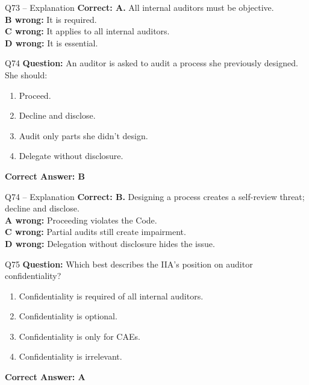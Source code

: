 \documentclass[aspectratio=169,10pt]{beamer}
\begin{document}
	\begin{frame}[t]{Q73 -- Explanation}
		\small
		\textbf{Correct: A.} All internal auditors must be objective. \\[4pt]
		\textbf{B wrong:} It is required. \\[2pt]
		\textbf{C wrong:} It applies to all internal auditors. \\[2pt]
		\textbf{D wrong:} It is essential.
	\end{frame}
	
	\begin{frame}[t]{Q74}
		\small
		\textbf{Question:} An auditor is asked to audit a process she previously designed. She should:
		\begin{enumerate}[label=\Alph*.,itemsep=1pt,topsep=2pt]
			\item Proceed.
			\item Decline and disclose.
			\item Audit only parts she didn't design.
			\item Delegate without disclosure.
		\end{enumerate}
		\vspace{4pt}
		\textbf{Correct Answer: B}
	\end{frame}
	
	\begin{frame}[t]{Q74 -- Explanation}
		\small
		\textbf{Correct: B.} Designing a process creates a self-review threat; decline and disclose. \\[4pt]
		\textbf{A wrong:} Proceeding violates the Code. \\[2pt]
		\textbf{C wrong:} Partial audits still create impairment. \\[2pt]
		\textbf{D wrong:} Delegation without disclosure hides the issue.
	\end{frame}
	
	\begin{frame}[t]{Q75}
		\small
		\textbf{Question:} Which best describes the IIA's position on auditor confidentiality?
		\begin{enumerate}[label=\Alph*.,itemsep=1pt,topsep=2pt]
			\item Confidentiality is required of all internal auditors.
			\item Confidentiality is optional.
			\item Confidentiality is only for CAEs.
			\item Confidentiality is irrelevant.
		\end{enumerate}
		\vspace{4pt}
		\textbf{Correct Answer: A}
	\end{frame}
	
\end{document}

